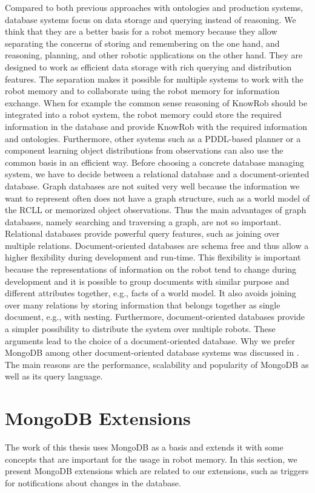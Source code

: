 Compared to both previous approaches with ontologies and production
systems, database systems focus on data storage and querying instead
of reasoning. We think that they are a better basis for a robot memory
because they allow separating the concerns of storing and remembering
on the one hand, and reasoning, planning, and other robotic
applications on the other hand. They are designed to work as efficient
data storage with rich querying and distribution features. The
separation makes it possible for multiple systems to work with the
robot memory and to collaborate using the robot memory for information
exchange. When for example the common
sense reasoning of KnowRob should be integrated into a robot system,
the robot memory could store the required information in the database
and provide KnowRob with the required information and
ontologies. Furthermore, other systems such as a PDDL-based planner or a
component learning object distributions from observations can also use the
common basis in an efficient way. Before choosing a concrete database
managing system, we have to decide between a relational database and a
document-oriented database. Graph databases are not suited very well
because the information we want to represent often does not have a
graph structure, such as a world model of the RCLL or memorized object
observations. Thus the main advantages of graph databases, namely searching
and traversing a graph, are not so important. Relational databases provide powerful query features,
such as joining over multiple relations. Document-oriented databases
are schema free and thus allow a higher flexibility during development
and run-time. This flexibility is important because the representations of
information on the robot tend to change during development and it is
possible to group documents with similar purpose and different
attributes together, e.g., facts of a world model. It also avoids
joining over many relations by storing information that
belongs together as single document, e.g., with nesting.  Furthermore,
document-oriented databases provide a simpler possibility to
distribute the system over multiple robots. These arguments lead to
the choice of a document-oriented database. Why we prefer MongoDB
among other document-oriented database systems was discussed in
. The main reasons are the performance,
scalability and popularity of MongoDB as well as its query language.

\section{MongoDB Extensions}
\label{sec:mongodb-extensions}
The work of this thesis uses MongoDB as a basis and extends it with
some concepts that are important for the usage in robot memory. In
this section, we present MongoDB extensions which are related to our
extensions, such as triggers for notifications about changes
in the database.

